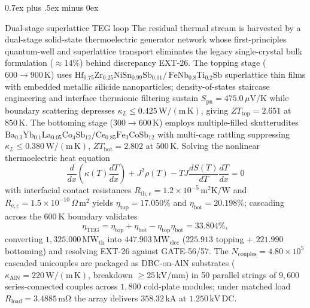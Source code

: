 \documentclass[11pt,journal,compsoc]{IEEEtran}
\makeatletter
\def\subsection{\@startsection{subsection}{2}{\z@}{-3.5ex plus -1.5ex minus -1.5ex}%
{0.7ex plus .5ex minus 0ex}{\normalfont\normalsize\sffamily\bfseries
\raggedright\hyphenpenalty=10000\exhyphenpenalty=10000\relax}}
\makeatother
\begin{document}
\subsection{Dual-stage superlattice TEG loop}
The residual thermal stream is harvested by a dual-stage solid-state
thermoelectric generator network whose first-principles quantum-well and
superlattice transport eliminates the legacy single-crystal bulk
formulation ($\approx 14\%$) behind discrepancy EXT-26. The topping stage
($600 \to 900\,\mathrm{K}$) uses
$\mathrm{Hf}_{0.75}\mathrm{Zr}_{0.25}\mathrm{NiSn}_{0.99}\mathrm{Sb}_{0.01}
/\,\mathrm{FeNb}_{0.8}\mathrm{Ti}_{0.2}\mathrm{Sb}$ superlattice thin
films with embedded metallic silicide nanoparticles; density-of-states
staircase engineering and interface thermionic filtering sustain
$S_{\mathrm{pn}} = 475.0\,\mu\mathrm{V/K}$ while boundary scattering
depresses $\kappa_L \le 0.425\,\mathrm{W/(m\,K)}$, giving
$ZT_{\mathrm{top}} = 2.651$ at $850\,\mathrm{K}$. The bottoming stage
($300 \to 600\,\mathrm{K}$) employs multiple-filled skutterudites
\cite{wbg2021}
$\mathrm{Ba}_{0.3}\mathrm{Yb}_{0.1}\mathrm{La}_{0.05}\mathrm{Co}_4
\mathrm{Sb}_{12}/\mathrm{Ce}_{0.85}\mathrm{Fe}_3\mathrm{CoSb}_{12}$ with
multi-cage rattling suppressing $\kappa_L \le 0.380\,\mathrm{W/(m\,K)}$,
$ZT_{\mathrm{bot}} = 2.802$ at $500\,\mathrm{K}$. Solving the nonlinear
thermoelectric heat equation
\begin{equation}
\frac{d}{dx}\!\left(\kappa(T)\frac{dT}{dx}\right) + J^2\rho(T)
- TJ\frac{dS(T)}{dT}\frac{dT}{dx} = 0
\label{eq:teg_bte}
\end{equation}
with interfacial contact resistances $R_{\mathrm{th,c}} = 1.2\times
10^{-5}\,\mathrm{m^2K/W}$ and $R_{\mathrm{e,c}} = 1.5\times10^{-10}\,
\Omega\,\mathrm{m^2}$ yields $\eta_{\mathrm{top}} = 17.050\%$ and
$\eta_{\mathrm{bot}} = 20.198\%$; cascading across the $600\
\mathrm{K}$ boundary validates
\begin{equation}
\eta_{\mathrm{TEG}} = \eta_{\mathrm{top}} + \eta_{\mathrm{bot}}
- \eta_{\mathrm{top}}\eta_{\mathrm{bot}} = 33.804\%,
\label{eq:teg_cascade}
\end{equation}
converting $1{,}325.000\,\mathrm{MW_{th}}$ into $447.903\,
\mathrm{MW_{elec}}$ ($225.913$ topping $+$ $221.990$ bottoming) and
resolving EXT-26 against GATE-56/57. The $N_{\mathrm{couples}} =
4.80\times10^{5}$ cascaded unicouples are packaged as DBC-on-AlN
substrates ($\kappa_{\mathrm{AlN}} = 220\,\mathrm{W/(m\,K)}$, breakdown
$\ge 25\,\mathrm{kV/mm}$) in 50 parallel strings of $9{,}600$
series-connected couples across $1{,}800$ cold-plate modules; under
matched load $R_{\mathrm{load}} = 3.4885\,\mathrm{m\Omega}$ the array
delivers $358.32\,\mathrm{kA}$ at $1.250\,\mathrm{kV\,DC}$.
\end{document}
